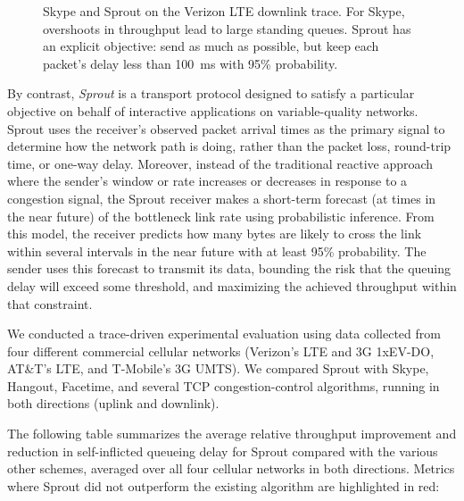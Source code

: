 \documentclass{article}
\begin{document}
\begin{figure}
\begin{centering}
\footnotesize\def\svgwidth{8 cm}
\caption{Skype and Sprout on the Verizon LTE downlink trace. For Skype, overshoots in throughput lead to large standing queues. Sprout has an explicit objective: send as much as possible, but keep each
packet's delay less than 100~ms with 95\% probability.}
\label{fig:skypevssprout}
\end{centering}
\end{figure}

By contrast, {\em Sprout} is a transport protocol designed to satisfy
a particular objective on behalf of interactive applications on
variable-quality networks. Sprout uses the receiver's observed packet
arrival times as the primary signal to determine how the network path
is doing, rather than the packet loss, round-trip time, or one-way
delay. Moreover, instead of the traditional reactive approach where
the sender's window or rate increases or decreases in response to a
congestion signal, the Sprout receiver makes a short-term forecast (at
times in the near future) of the bottleneck link rate using
probabilistic inference.  From this model, the receiver predicts how
many bytes are likely to cross the link within several intervals in
the near future with at least 95\% probability. The sender uses this
forecast to transmit its data, bounding the risk that the queuing
delay will exceed some threshold, and maximizing the achieved
throughput within that constraint.

We conducted a trace-driven experimental evaluation using data
collected from four different commercial cellular networks (Verizon's
LTE and 3G 1xEV-DO, AT\&T's LTE, and T-Mobile's 3G UMTS). We compared
Sprout with Skype, Hangout, Facetime, and several TCP
congestion-control algorithms, running in both directions (uplink and
downlink).

The following table summarizes the average relative throughput
improvement and reduction in self-inflicted queueing delay for Sprout
compared with the various other schemes, averaged over all four
cellular networks in both directions. Metrics where Sprout did not
outperform the existing algorithm are highlighted in red:

\vspace{\baselineskip}
\end{document}
